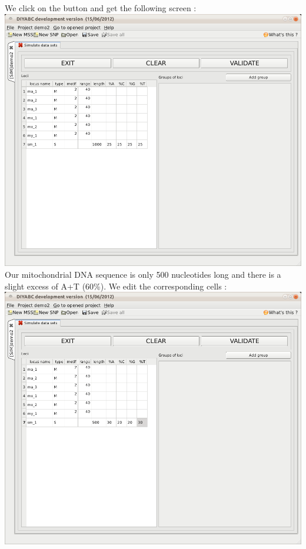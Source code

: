 We click on the  button and get the following screen :\\

\includegraphics[scale=0.33]{gui_pictures/Capture-DIYABC-73.png} \\

Our mitochondrial DNA sequence is only 500 nucleotides long and there is a slight excess of A+T (60\%). We edit the corresponding cells : \\

\includegraphics[scale=0.33]{gui_pictures/Capture-DIYABC-74.png} \\

